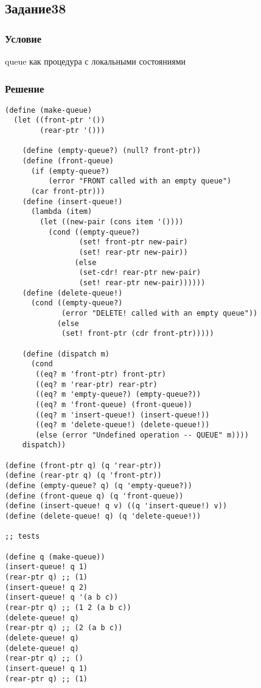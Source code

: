 \documentclass[10pt,a4paper]{article}
\begin{document}
\subsection*{Задание38}
\subsubsection*{Условие}
queue как процедура с локальными состояниями
\subsubsection*{Решение}
\begin{lstlisting}
(define (make-queue)
  (let ((front-ptr '())
        (rear-ptr '()))

    (define (empty-queue?) (null? front-ptr))
    (define (front-queue)
      (if (empty-queue?)
          (error "FRONT called with an empty queue")
      (car front-ptr)))
    (define (insert-queue!)
      (lambda (item)
        (let ((new-pair (cons item '())))
          (cond ((empty-queue?)
                 (set! front-ptr new-pair)
                 (set! rear-ptr new-pair))
                (else
                 (set-cdr! rear-ptr new-pair)
                 (set! rear-ptr new-pair))))))
    (define (delete-queue!)
      (cond ((empty-queue?)
             (error "DELETE! called with an empty queue"))
            (else
             (set! front-ptr (cdr front-ptr)))))

    (define (dispatch m)
      (cond
       ((eq? m 'front-ptr) front-ptr)
       ((eq? m 'rear-ptr) rear-ptr)
       ((eq? m 'empty-queue?) (empty-queue?))
       ((eq? m 'front-queue) (front-queue))
       ((eq? m 'insert-queue!) (insert-queue!))
       ((eq? m 'delete-queue!) (delete-queue!))
       (else (error "Undefined operation -- QUEUE" m))))
    dispatch))

(define (front-ptr q) (q 'rear-ptr))
(define (rear-ptr q) (q 'front-ptr))
(define (empty-queue? q) (q 'empty-queue?))
(define (front-queue q) (q 'front-queue))
(define (insert-queue! q v) ((q 'insert-queue!) v))
(define (delete-queue! q) (q 'delete-queue!))

;; tests

(define q (make-queue))
(insert-queue! q 1)
(rear-ptr q) ;; (1)
(insert-queue! q 2)
(insert-queue! q '(a b c))
(rear-ptr q) ;; (1 2 (a b c))
(delete-queue! q)
(rear-ptr q) ;; (2 (a b c))
(delete-queue! q)
(delete-queue! q)
(rear-ptr q) ;; ()
(insert-queue! q 1)
(rear-ptr q) ;; (1)

\end{lstlisting}
\end{document}
